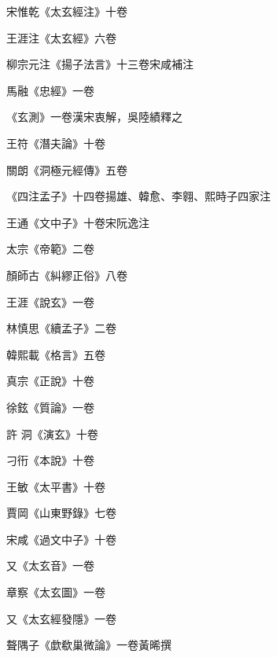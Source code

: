 \begin{pinyinscope}
 宋惟乾《太玄經注》十卷



 王涯注《太玄經》六卷



 柳宗元注《揚子法言》十三卷宋咸補注



 馬融《忠經》一卷



 《玄測》一卷漢宋衷解，吳陸績釋之



 王符《潛夫論》十卷



 關朗《洞極元經傳》五卷



 《四注孟子》十四卷揚雄、韓愈、李翱、熙時子四家注



 王通《文中子》十卷宋阮逸注



 太宗《帝範》二卷



 顏師古《糾繆正俗》八卷



 王涯《說玄》一卷



 林慎思《續孟子》二卷



 韓熙載《格言》五卷



 真宗《正說》十卷



 徐鉉《質論》一卷



 許
 洞《演玄》十卷



 刁衎《本說》十卷



 王敏《太平書》十卷



 賈岡《山東野錄》七卷



 宋咸《過文中子》十卷



 又《太玄音》一卷



 章察《太玄圖》一卷



 又《太玄經發隱》一卷



 聱隅子《歔欷巢微論》一卷黃晞撰




\end{pinyinscope}
